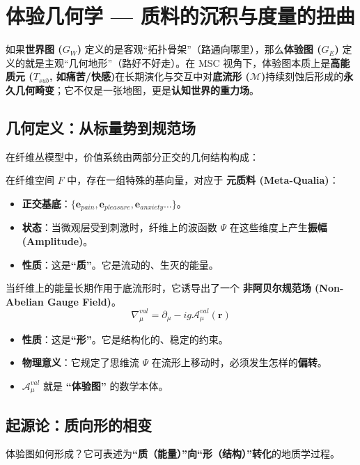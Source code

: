 \chapter{体验几何学 — 质料的沉积与度量的扭曲}
\label{chp:experience_geometry}

如果\textbf{世界图 ($G_W$)} 定义的是客观“拓扑骨架”（路通向哪里），那么\textbf{体验图 ($G_E$)} 定义的就是主观“几何地形”（路好不好走）。在 MSC 视角下，体验图本质上是\textbf{高能质元 ($T_{sub}$, 如痛苦/快感)}在长期演化与交互中对\textbf{底流形 ($\mathcal{M}$)}持续刻蚀后形成的\textbf{永久几何畸变}；它不仅是一张地图，更是\textbf{认知世界的重力场}。

\section{几何定义：从标量势到规范场}
\label{sec:section_9469}
在纤维丛模型中，价值系统由两部分正交的几何结构构成：



在纤维空间 $F$ 中，存在一组特殊的基向量，对应于 \textbf{元质料 (Meta-Qualia)}：
\begin{itemize}
    \item   \textbf{正交基底}：$\{\mathbf{e}_{pain}, \mathbf{e}_{pleasure}, \mathbf{e}_{anxiety} \dots\}$。
    \item   \textbf{状态}：当微观层受到刺激时，纤维上的波函数 $\Psi$ 在这些维度上产生\textbf{振幅 (Amplitude)}。
    \item   \textbf{性质}：这是\textbf{“质”}。它是流动的、生灭的能量。
\end{itemize}




当纤维上的能量长期作用于底流形时，它诱导出了一个 \textbf{非阿贝尔规范场 (Non-Abelian Gauge Field)}。
$$ \nabla_\mu^{val} = \partial_\mu - i g \mathcal{A}_\mu^{val}(\mathbf{r}) $$
\begin{itemize}
    \item   \textbf{性质}：这是\textbf{“形”}。它是结构化的、稳定的约束。
    \item   \textbf{物理意义}：它规定了思维流 $\Psi$ 在流形上移动时，必须发生怎样的\textbf{偏转}。
    \item   \textbf{$\mathcal{A}_\mu^{val}$} 就是 \textbf{“体验图”} 的数学本体。
\end{itemize}

\section{起源论：质向形的相变}
\label{sec:section_6973}
体验图如何形成？它可表述为\textbf{“质（能量）”向“形（结构）”转化}的地质学过程。



